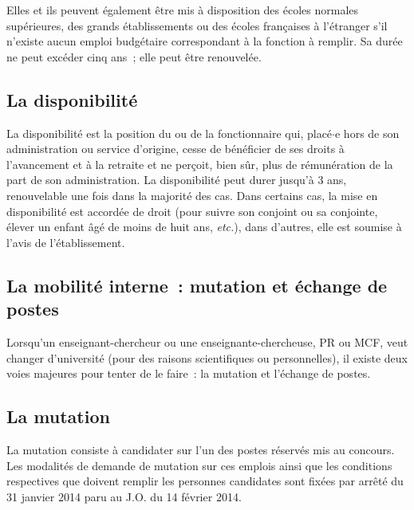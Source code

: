 Elles et ils peuvent \'egalement \^etre mis \`a disposition des \'ecoles
normales sup\'erieures, des grands \'eta\-blis\-se\-ments ou des
\'ecoles fran\c caises \`a l'\'etranger s'il n'existe aucun emploi
budg\'etaire correspondant \`a la fonction \`a remplir. Sa dur\'ee
ne peut exc\'eder cinq ans~; elle peut \^etre renouvel\'ee.

\subsection*{La disponibilit\'e}

La disponibilit\'e est la position du ou de la fonctionnaire qui, plac\'e$\cdot$e
hors de son administration ou service d'origine, cesse de
b\'en\'eficier de ses droits \`a l'avancement et \`a la retraite et
ne per\c coit, bien s\^ur, plus de r\'emun\'eration de la part de
son administration. La disponibilit\'e peut durer jusqu'\`a 3 ans,
renouvelable une fois dans la majorit\'e des cas. Dans certains cas,
la mise en disponibilit\'e est accord\'ee de droit (pour suivre son
conjoint ou sa conjointe, \'elever un enfant \^ag\'e de moins de huit ans, {\em
etc.}), dans d'autres, elle est soumise \`a l'avis de
l'\'etablissement.


\subsection{La mobilit\'e interne~: mutation et \'echange de postes}

Lorsqu'un enseignant-chercheur ou une enseignante-chercheuse, PR ou MCF, veut changer
d'universit\'e (pour des raisons scientifiques ou personnelles), il
existe deux voies majeures pour tenter de le faire~: la mutation et
l'\'echange de postes.

\subsection*{La mutation}
\label{mutation}


La mutation consiste \`a candidater sur l'un des postes r\'eserv\'es mis au
concours. %
Les modalit\'es de demande de mutation sur ces emplois ainsi que les conditions respectives 
que doivent remplir les personnes candidates sont fix\'ees par  arr\^et\'e du 31 janvier 2014 
paru au J.O. du 14 f\'evrier 2014. 



